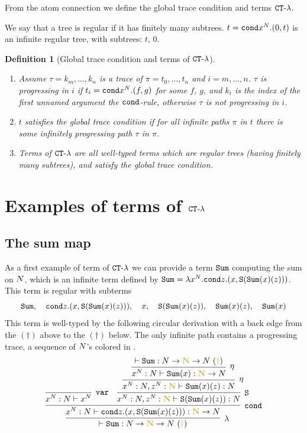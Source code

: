 \documentclass{article}
\newtheorem{definition}[theorem]{Definition}
\begin{document}
From the atom connection we define the global trace condition and terms ${ {\tt CT}\mbox{-}\lambda}$.

We say that a tree is regular if it has finitely many subtrees. $t={\tt cond} x^{N}.(0,t)$ is an infinite regular tree,
with subtrees: $t$, $0$.

\begin{definition}[Global trace condition and terms of ${ {\tt CT}\mbox{-}\lambda}$]
\begin{enumerate}
\item
Assume $\tau = k_m, \ldots, k_n$ is a trace of $\pi =t_0, \ldots, t_n$ and $i=m,\ldots, n$.
$\tau$ is progressing in $i$ if $t_i={\tt cond} x^{N}.(f,g)$ for some $f$, $g$,
and $k_i$ is the index of the first \emph{unnamed} argument the ${\tt cond}$-rule, 
otherwise $\tau$ is not progressing in $i$.

\item
$t$ satisfies the global trace condition if for all infinite paths $\pi$ in $t$ 
there is some infinitely progressing path $\tau$ in $\pi$.

\item
Terms of ${ {\tt CT}\mbox{-}\lambda}$ are all well-typed terms which are regular trees (having finitely many subtrees), 
and satisfy the global trace condition.

\end{enumerate}
\end{definition}


\section{Examples of terms of ${ {\tt CT}\mbox{-}\lambda}$}

\subsection{The sum map}
As a first example of term of  ${ {\tt CT}\mbox{-}\lambda}$ we can provide a term ${\tt Sum}$ computing the sum on ${N}$,
which is an infinite term defined by ${\tt Sum} = \lambda x^{N}.{\tt cond} z.(x,{\tt S}({\tt Sum}(x)(z)))$.
This term is regular with subterms 
$$
\Sum, \  \  \ \cond z.(x,\Succ(\Sum(x)(z))), 
\  \  \ x, \  \  \ \Succ(\Sum(x)(z)),  \  \  \ \Sum(x)(z), \  \  \ \Sum(x)
$$
This term is well-typed by the following circular derivation with a back edge from the $(\dagger)$ above to the $(\dagger)$ below.
The only infinite path contains a progressing trace, a sequence of ${N}$'s colored in 
. 
\[
\infer[\lambda]{
  \vdash \Sum:\N \rightarrow \bfColor{oldgold}{\N} \rightarrow \N\ 
(\bfColor{oldgold}{\dagger})
}{
  \infer[\cond]{
    x^\N : \N \vdash \cond z.(x,\Succ(\Sum(x)(z))): \bfColor{oldgold}{\N} \rightarrow \N
  }{
    \infer[\var]{
      x^\N : \N \vdash x^\N
    }{}
    &
    \infer[\Succ]{
      x^\N:\N, z^\N : \bfColor{oldgold}{\N} \vdash \Succ(\Sum(x)(z)): \N
    }{
      \infer[\eta]{
       x^\N:\N, z^\N : \bfColor{oldgold}{\N} \vdash \Sum(x)(z): \N
      }{
        \infer[\eta]{
          x^\N : \N \vdash \Sum(x): \bfColor{oldgold}{\N} \rightarrow \N
        }{
          \vdash \Sum: \N \rightarrow \bfColor{oldgold}{\N} \rightarrow \N\ 
(\bfColor{oldgold}{\dagger})
        }
      }
    }
  }
}
\]
\end{document}
